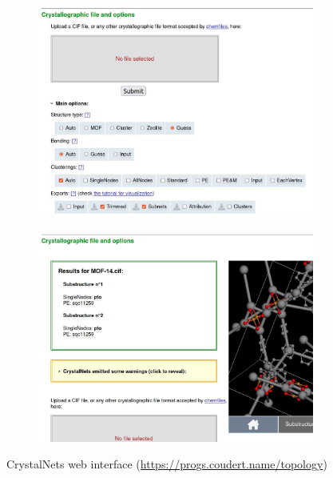 \documentclass[main.tex]{subfiles}
\begin{document}
\begin{figure}
	\centering
	\begin{subfigure}{\linewidth}
		\centering
		\includegraphics[width=0.9\linewidth]{figures/topology/WebsitePrompt.jpg}
		\label{fig:crystalnetsweb_prompt}
	\end{subfigure}

\vspace{2em}

	\begin{subfigure}{\linewidth}
		\centering
		\includegraphics[width=0.9\linewidth]{figures/topology/WebsiteAnswer.jpg}
		\label{fig:crystalnetsweb_answer}
	\end{subfigure}
	\caption{CrystalNets web interface (\url{https://progs.coudert.name/topology})}\label{fig:crystalnetsweb}
\end{figure}
\end{document}
